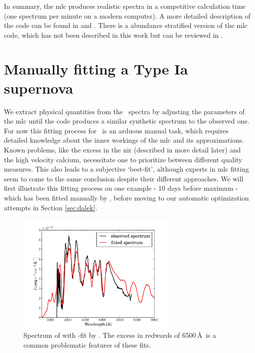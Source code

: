 In summary, the \gls{mlc} produces realistic spectra in a competitive calculation time (one spectrum per minute on a modern computer). A more detailed description of the code can be found in  \citet{1993A&A...279..447M} and \citet{2000A&A...363..705M}. There is a abundance stratified version of the \gls{mlc} code, which has not been described in this work but can be reviewed in \citet{2005MNRAS.360.1231S}.


\section{Manually fitting a Type Ia supernova}
\label{sec:manual_sneia}

We extract physical quantities from the \snia\ spectra by adjusting the parameters of the \gls{mlc} until the code produces a similar synthetic spectrum to the observed one. For now this fitting process for \sneia\ is an arduous manual task, which requires detailed knowledge about the inner workings of the \gls{mlc} and its approximations. Known problems, like the excess in the \gls{nir} (described in more detail later) and the high velocity calcium, necessitate one to prioritize between different quality measures. This also leads to a subjective `best-fit', although experts in \gls{mlc} fitting seem to come to the same conclusion despite their different approaches. We will first illustrate this fitting process on one example -  10 days before maximum \citep{2004MNRAS.348..261B} - which has been fitted manually by \citet[][]{hachinger_dipl2007}, before moving to our automatic optimization attempts in Section \ref{sec:dalek}. 
\begin{figure}[htbp] %
   \centering
   \includegraphics[width=0.7\textwidth]{chapter_dalek/plots/bf2002bo-10.pdf} 
   \caption{Spectrum of  \citep{2004MNRAS.348..261B} with -fit by \citet{hachinger_dipl2007}. The excess in redwards of 6500\,\AA\ is a common problematic features of these fits.}
   \label{fig:sn2002bo-10_bf}
\end{figure}

